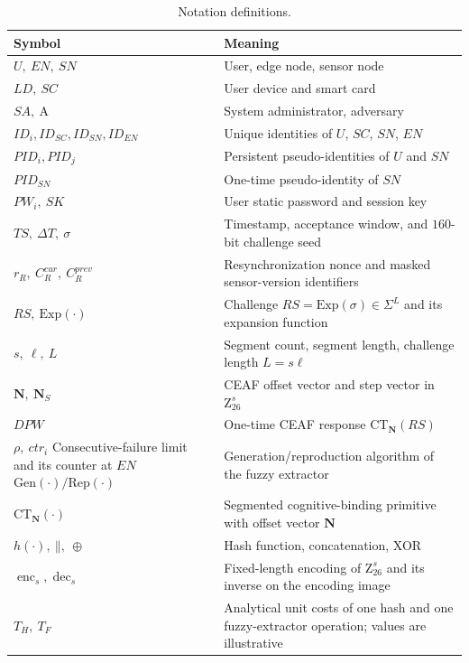 \documentclass[cmc,article,submit,moreauthors,pdftex]{Definitions/tsp}
\renewcommand{\mathsf}[1]{\mathrm{#1}}
\renewcommand{\mathcal}[1]{\mathrm{#1}}
\renewcommand{\mathbb}[1]{\mathrm{#1}}
\newcommand{\cc}{\mathbin{\|}}
\newcommand{\CT}{\mathsf{CT}}
\newcommand{\Gen}{\mathrm{Gen}}
\newcommand{\Rep}{\mathrm{Rep}}
\newcommand{\advA}{\mathcal{A}}
\providecommand{\DIFadd}[1]{{\protect\color{blue} \sf #1}} %
\providecommand{\DIFdel}[1]{{\protect\color{red} \scriptsize #1}} %
\providecommand{\DIFaddFL}[1]{\DIFadd{#1}} %
\providecommand{\DIFdelFL}[1]{\DIFdel{#1}} %
\providecommand{\DIFaddbeginFL}{} %
\providecommand{\DIFaddendFL}{} %
\providecommand{\DIFdelbeginFL}{} %
\providecommand{\DIFdelendFL}{} %
\begin{document}
\begin{table}[t]
\caption{Notation definitions.\label{tab:notation}}
\begin{tabularx}{\textwidth}{lX}
\toprule
\textbf{Symbol} & \textbf{Meaning}\\
\midrule
$U,\ EN,\ SN$ & User, edge node, sensor node\\
$LD,\ SC$ & User device and smart card\\
$SA,\ \advA$ & System administrator, adversary\\
$ID_i, ID_{SC}, ID_{SN}, ID_{EN}$ & Unique identities of $U$, $SC$, $SN$, $EN$\\
$PID_i, PID_j$ & Persistent pseudo-identities of $U$ and $SN$\\
$PID_{SN}$ & One-time pseudo-identity of $SN$\\
$PW_i,\ SK$ & User static password and session key\\
$TS,\ \Delta T,\ \sigma$ & Timestamp, acceptance window, and $160$-bit challenge seed\\
\DIFaddbeginFL \DIFaddFL{$r_R,\ C_R^{cur},\ C_R^{prev}$ }& \DIFaddFL{Resynchronization nonce and masked sensor-version identifiers}\\
\DIFaddendFL $RS,\ \mathsf{Exp}(\cdot)$ & Challenge $RS=\mathsf{Exp}(\sigma)\in\Sigma^{L}$ and its expansion function\\
$s,\ \ell,\ L$ & Segment count, segment length, challenge length $L=s\ell$\\
$\mathbf{N},\ \mathbf{N}_S$ & CEAF offset vector and step vector in $\mathbb{Z}_{26}^{s}$\\
$DPW$ & One-time CEAF response $\CT_{\mathbf{N}}(RS)$\\
\DIFdelbeginFL \DIFdelFL{$\rho,\ ctr_i$ }%
\DIFdelFL{Consecutive-failure limit and its counter at $EN$}%
\DIFdelendFL $\Gen(\cdot)/\Rep(\cdot)$ & Generation/reproduction algorithm of the fuzzy extractor\\
$\CT_{\mathbf{N}}(\cdot)$ & Segmented cognitive-binding primitive with offset vector $\mathbf{N}$\\
$h(\cdot),\ \cc,\ \oplus$ & Hash function, concatenation, XOR\\
\DIFaddbeginFL \DIFaddFL{$\operatorname{enc}_s,\operatorname{dec}_s$ }& \DIFaddFL{Fixed-length encoding of $\mathbb{Z}_{26}^{s}$ and its inverse on the encoding image}\\
\DIFaddFL{$T_H,\ T_F$ }& \DIFaddFL{Analytical unit costs of one hash and one fuzzy-extractor operation; values are illustrative}\\
\DIFaddendFL \bottomrule
\end{tabularx}
\end{table}
\end{document}
